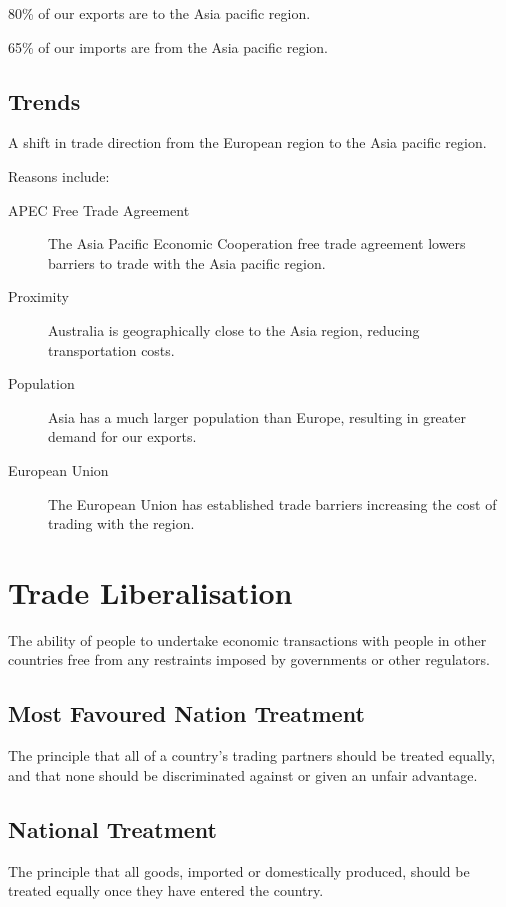\documentclass[a4paper,11pt]{article}
\begin{document}
80\% of our exports are to the Asia pacific region.

65\% of our imports are from the Asia pacific region.


\subsection{Trends}

A shift in trade direction from the European region to the Asia pacific region.

Reasons include:

\begin{description}
\item [APEC Free Trade Agreement] The Asia Pacific Economic Cooperation free
	trade agreement lowers barriers to trade with the Asia pacific region.
\item [Proximity] Australia is geographically close to the Asia region,
	reducing transportation costs.
\item [Population] Asia has a much larger population than Europe, resulting in
	greater demand for our exports.
\item [European Union] The European Union has established trade barriers
	increasing the cost of trading with the region.
\end{description}




\section{Trade Liberalisation}

The ability of people to undertake economic transactions with people in other
countries free from any restraints imposed by governments or other regulators.


\subsection{Most Favoured Nation Treatment}

The principle that all of a country's trading partners should be treated
equally, and that none should be discriminated against or given an unfair
advantage.


\subsection{National Treatment}

The principle that all goods, imported or domestically produced, should be
treated equally once they have entered the country.
\end{document}
